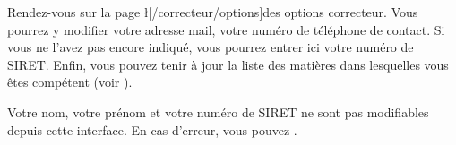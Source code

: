﻿Rendez-vous sur la page \l[/correcteur/options]{des options correcteur}.
Vous pourrez y modifier votre adresse mail, votre numéro de téléphone de contact.
Si vous ne l'avez pas encore indiqué, vous pourrez entrer ici votre numéro de SIRET.
Enfin, vous pouvez tenir à jour la liste des matières dans lesquelles vous êtes compétent (voir ).

Votre nom, votre prénom et votre numéro de SIRET ne sont pas modifiables depuis cette interface. En cas d'erreur, vous pouvez .